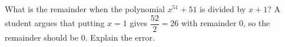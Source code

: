 What is the remainder when the polynomial $x^{51}+51$ is divided by $x+1$? A student argues that putting $x=1$ gives $\dfrac{52}{2}=26$ with remainder $0$, so the remainder should be $0$. Explain the error.
